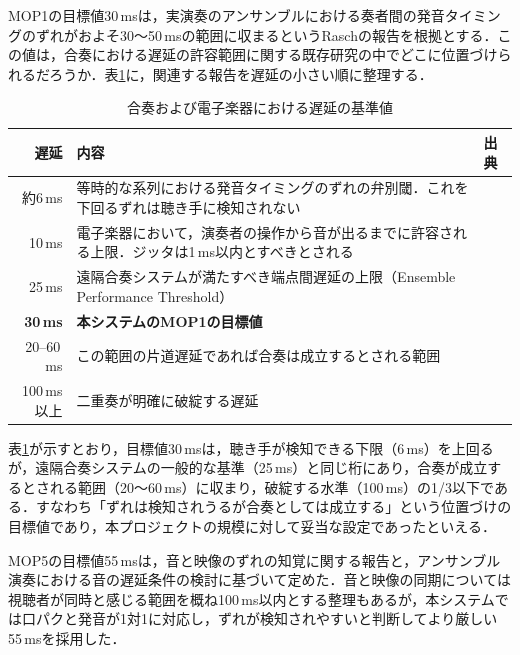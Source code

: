 \documentclass[uplatex,dvipdfmx]{jlreq}
\begin{document}
MOP1の目標値30\,msは，実演奏のアンサンブルにおける奏者間の発音タイミングのずれがおよそ30〜50\,msの範囲に収まるというRaschの報告\cite{rasch}を根拠とする．この値は，合奏における遅延の許容範囲に関する既存研究の中でどこに位置づけられるだろうか．表\ref{tab:latency-scale}に，関連する報告を遅延の小さい順に整理する．

\begin{table}[tb]
\caption{合奏および電子楽器における遅延の基準値}
\label{tab:latency-scale}
\begin{center}
\footnotesize
\begin{tabular}{rp{22em}l}
\hline
遅延 & 内容 & 出典 \\
\hline
約6\,ms & 等時的な系列における発音タイミングのずれの弁別閾．これを下回るずれは聴き手に検知されない & \cite{friberg1995} \\
10\,ms & 電子楽器において，演奏者の操作から音が出るまでに許容される上限．ジッタは1\,ms以内とすべきとされる & \cite{wessel2002} \\
25\,ms & 遠隔合奏システムが満たすべき端点間遅延の上限（Ensemble Performance Threshold） & \cite{lakiotakis2019} \\
\textbf{30\,ms} & \textbf{本システムのMOP1の目標値} & \cite{rasch} \\
20--60\,ms & この範囲の片道遅延であれば合奏は成立するとされる範囲 & \cite{chafe2004} \\
100\,ms以上 & 二重奏が明確に破綻する遅延 & \cite{bartlette2006} \\
\hline
\end{tabular}
\end{center}
\end{table}

表\ref{tab:latency-scale}が示すとおり，目標値30\,msは，聴き手が検知できる下限（6\,ms）を上回るが，遠隔合奏システムの一般的な基準（25\,ms）と同じ桁にあり，合奏が成立するとされる範囲（20〜60\,ms）に収まり，破綻する水準（100\,ms）の1/3以下である．すなわち「ずれは検知されうるが合奏としては成立する」という位置づけの目標値であり，本プロジェクトの規模に対して妥当な設定であったといえる．

MOP5の目標値55\,msは，音と映像のずれの知覚に関する報告\cite{arrighi}と，アンサンブル演奏における音の遅延条件の検討\cite{nagao2012}に基づいて定めた．音と映像の同期については視聴者が同時と感じる範囲を概ね100\,ms以内とする整理もある\cite{kuwahara2019}が，本システムでは口パクと発音が1対1に対応し，ずれが検知されやすいと判断してより厳しい55\,msを採用した．
\end{document}
